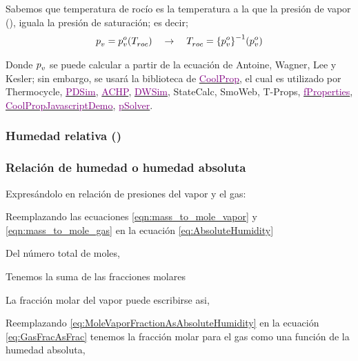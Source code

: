 Sabemos que temperatura de rocío es la temperatura a la que la presión de vapor (\pVapor), iguala la presión de saturación; es decir;
\begin{align}
    p_{\text{\ensuremath{{v}}}}^{} = p_{\text{\ensuremath{{v}}}}^{{{o}}}({T}_{\text{\ensuremath{{roc}}}}^{}) \quad \rightarrow \quad {T}_{\text{\ensuremath{{roc}}}}^{} = {\{p_{\text{\ensuremath{{v}}}}^{{{{o}}}}\}}^{-1}(p_{\text{\ensuremath{{v}}}}^{{{o}}})
\end{align}

Donde $p_{\text{\ensuremath{{v}}}}^{}$ se puede calcular a partir de la ecuación de Antoine, Wagner, Lee y Kesler; sin embargo, se usará la biblioteca de \href{https://coolprop.org}{\textcolor{purple}{CoolProp}}, el cual es utilizado por Thermocycle, \href{https://pdsim.sourceforge.net/}{\textcolor{purple}{PDSim}}, \href{https://achp.sourceforge.net/ACHPGUI/Tutorial.html#getting-started}{\textcolor{purple}{ACHP}}, \href{https://sourceforge.net/projects/dwsim/}{\textcolor{purple}{DWSim}}, StateCalc, SmoWeb, T-Props, \href{https://app.fproperties.org/}{\textcolor{purple}{fProperties}}, \href{https://github.com/dvd101x/web-thermodynamics}{\textcolor{purple}{CoolPropJavascriptDemo}}, \href{https://app.psolver.org/app/}{\textcolor{purple}{pSolver}}.

\subsubsection{Humedad relativa (\texorpdfstring{\relativeHumidity[]{}}{phi})}
    \eqnRelativeHumidity



\subsubsection{Relación de humedad o humedad absoluta}
    \eqAbsoluteHumidity
    Expresándolo en relación de presiones del vapor y el gas:
    \eqMassToMolOfVaporAndGas
    
    Reemplazando las ecuaciones \eqref{eqn:mass_to_mole_vapor} y \eqref{eqn:mass_to_mole_gas} en la ecuación \eqref{eq:AbsoluteHumidity}
    \eqAbsoluteHumidityToMol
    
    Del número total de moles,
    \eqTotalMoles*

    Tenemos la suma de las fracciones molares    
    \eqGasFracAsVaporFrac

    \eqAbsoluteHumidityToMolAsMolarFraction

    \eqAbsoluteHumidityToMolAsMolarVaporFraction


    La fracción molar del vapor puede escribirse asi,
    \eqMoleVaporFractionAsAbsoluteHumidity

    Reemplazando \eqref{eq:MoleVaporFractionAsAbsoluteHumidity} en la ecuación \eqref{eq:GasFracAsFrac} tenemos la fracción molar para el gas como una función de la humedad absoluta,
    \eqMoleGasFractionAsAbsoluteHumidity

